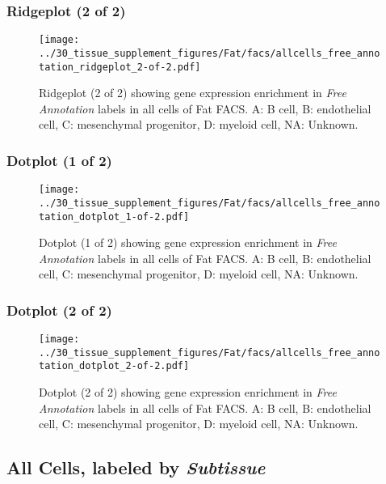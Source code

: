 \clearpage

\subsubsection{Ridgeplot (2 of 2)}
\begin{figure}[h]
\centering
\texttt{[image: ../30\_tissue\_supplement\_figures/Fat/facs/allcells\_free\_annotation\_ridgeplot\_2-of-2.pdf]}

\caption{ Ridgeplot (2 of 2)  showing gene expression enrichment in \emph{Free Annotation} labels in all cells of Fat FACS. A: B cell, B: endothelial cell, C: mesenchymal progenitor, D: myeloid cell, NA: Unknown.}
\end{figure}


\clearpage

\subsubsection{Dotplot (1 of 2)}
\begin{figure}[h]
\centering
\texttt{[image: ../30\_tissue\_supplement\_figures/Fat/facs/allcells\_free\_annotation\_dotplot\_1-of-2.pdf]}

\caption{ Dotplot (1 of 2)  showing gene expression enrichment in \emph{Free Annotation} labels in all cells of Fat FACS. A: B cell, B: endothelial cell, C: mesenchymal progenitor, D: myeloid cell, NA: Unknown.}
\end{figure}


\clearpage

\subsubsection{Dotplot (2 of 2)}
\begin{figure}[h]
\centering
\texttt{[image: ../30\_tissue\_supplement\_figures/Fat/facs/allcells\_free\_annotation\_dotplot\_2-of-2.pdf]}

\caption{ Dotplot (2 of 2)  showing gene expression enrichment in \emph{Free Annotation} labels in all cells of Fat FACS. A: B cell, B: endothelial cell, C: mesenchymal progenitor, D: myeloid cell, NA: Unknown.}
\end{figure}


\clearpage

\subsection{All Cells, labeled by \emph{Subtissue}}
